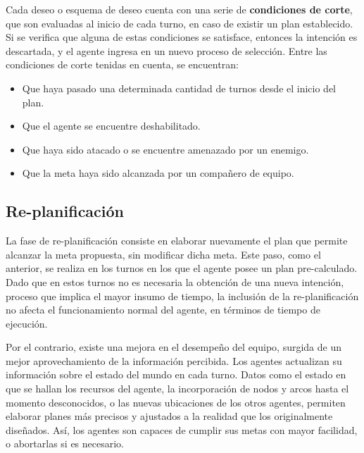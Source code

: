 \documentclass[oneside]{book}
\begin{document}
Cada deseo o esquema de deseo cuenta con una serie de \textbf{condiciones de corte}, que 
son evaluadas al inicio de cada turno, en caso de existir un plan establecido. Si se verifica 
que alguna de estas condiciones se satisface, entonces la intención es descartada, y el 
agente ingresa en un nuevo proceso de selección. 
Entre las condiciones de corte tenidas en cuenta, se encuentran: 

\begin{itemize}
	\item Que haya pasado una determinada cantidad de turnos desde el inicio del plan.
	\item Que el agente se encuentre deshabilitado.
	\item Que haya sido atacado o se encuentre amenazado por un enemigo.
	\item Que la meta haya sido alcanzada por un compañero de equipo.
\end{itemize}

\subsection{Re-planificación}


La fase de re-planificación consiste en elaborar nuevamente el plan que permite alcanzar 
la meta propuesta, sin modificar dicha meta. Este paso, como el anterior, se realiza en 
los turnos en los que el agente posee un plan pre-calculado. Dado que en estos turnos no 
es necesaria la obtención de una nueva intención, proceso que implica el mayor insumo de 
tiempo, la inclusión de la re-planificación no afecta el funcionamiento normal del agente, 
en términos de tiempo de ejecución. 

Por el contrario, existe una mejora en el desempeño del equipo, surgida de un mejor 
aprovechamiento de la información percibida. Los agentes actualizan su información sobre 
el estado del mundo en cada turno. Datos como el estado en que se hallan los recursos del 
agente, la incorporación de nodos y arcos hasta el momento desconocidos, o las nuevas 
ubicaciones de los otros agentes, permiten elaborar planes más precisos y ajustados a la 
realidad que los originalmente diseñados. Así, los agentes son capaces de cumplir sus 
metas con mayor facilidad, o abortarlas si es necesario.

\end{document}

